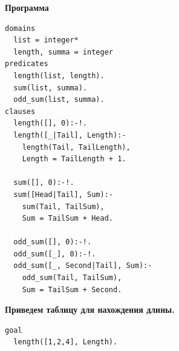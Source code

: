 \documentclass[a4paper,14pt]{extreport} %
\begin{document}
\hfill

\textbf{Программа}

\begin{lstlisting}
domains
  list = integer*
  length, summa = integer
predicates
  length(list, length).
  sum(list, summa).
  odd_sum(list, summa).
clauses
  length([], 0):-!.
  length([_|Tail], Length):-
    length(Tail, TailLength),
    Length = TailLength + 1.
    
  sum([], 0):-!.
  sum([Head|Tail], Sum):-
    sum(Tail, TailSum),
    Sum = TailSum + Head.
    
  odd_sum([], 0):-!.
  odd_sum([_], 0):-!.
  odd_sum([_, Second|Tail], Sum):-
    odd_sum(Tail, TailSum),
    Sum = TailSum + Second.
\end{lstlisting}

\textbf{Приведем таблицу для нахождения длины. }
\begin{lstlisting}
goal
  length([1,2,4], Length).
\end{lstlisting}
\end{document}
